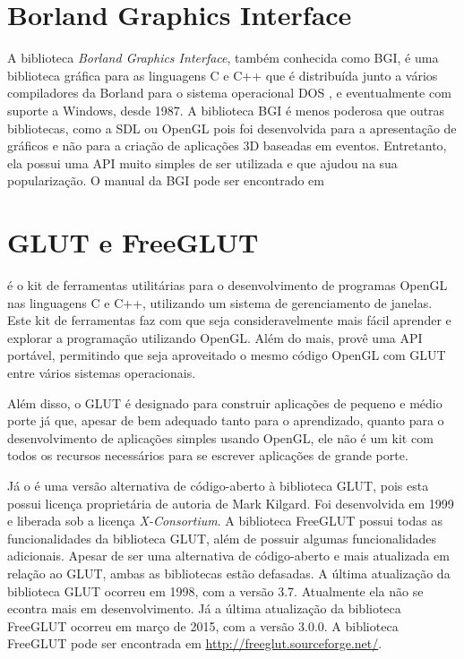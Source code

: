\documentclass[12pt, %
openright,
oneside, %
a4paper,    %
brazil]{facom-ufu-abntex2}
\begin{document}
\section{Borland Graphics Interface}
A biblioteca \textit{Borland Graphics Interface}, também conhecida como BGI, é uma biblioteca gráfica para as linguagens C e C++ que é distribuída junto a vários compiladores da Borland para o sistema operacional DOS \cite{BGI:Drivers}, e eventualmente com suporte a Windows, desde 1987. A biblioteca BGI é menos poderosa que outras bibliotecas, como a SDL ou OpenGL pois foi desenvolvida para a apresentação de gráficos e não para a criação de aplicações 3D baseadas em eventos. Entretanto, ela possui uma API muito simples de ser utilizada e que ajudou na sua popularização. O manual da BGI pode ser encontrado em 

\section{GLUT e FreeGLUT}
 é o kit de ferramentas utilitárias para o desenvolvimento de programas OpenGL nas linguagens C e C++, utilizando um sistema de gerenciamento de janelas. Este kit de ferramentas faz com que seja consideravelmente mais fácil aprender e explorar a programação utilizando OpenGL. Além do mais, provê uma API portável, permitindo que seja aproveitado o mesmo código OpenGL com GLUT entre vários sistemas operacionais.

Além disso, o GLUT é designado para construir aplicações de pequeno e médio porte já que, apesar de bem adequado tanto para o aprendizado, quanto para o desenvolvimento de aplicações simples usando OpenGL, ele não é um kit com todos os recursos necessários para se escrever aplicações de grande porte.

Já o  é uma versão alternativa de código-aberto à biblioteca GLUT, pois esta possui licença proprietária de autoria de Mark Kilgard. Foi desenvolvida em 1999 e liberada sob a licença \textit{X-Consortium}. A biblioteca FreeGLUT possui todas as funcionalidades da biblioteca GLUT, além de possuir algumas funcionalidades adicionais. Apesar de ser uma alternativa de código-aberto e mais atualizada em relação ao GLUT, ambas as bibliotecas estão defasadas. A última atualização da biblioteca GLUT ocorreu em 1998, com a versão 3.7. Atualmente ela não se econtra mais em desenvolvimento. Já a última atualização da biblioteca FreeGLUT ocorreu em março de 2015, com a versão 3.0.0. A biblioteca FreeGLUT pode ser encontrada em \url{http://freeglut.sourceforge.net/}.
\end{document}
